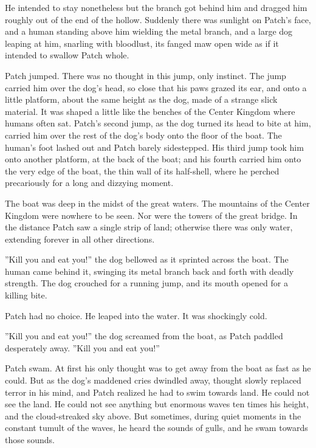 \documentclass[11pt]{article}
\begin{document}
 He intended to stay nonetheless %
 but the branch got behind him and dragged him roughly out of the end of the hollow. Suddenly there was sunlight on Patch's face, and a human standing above him wielding the metal branch, and a large dog leaping at him, snarling with bloodlust, its fanged maw open wide as if it intended to swallow Patch whole.\par
 Patch jumped. There was no thought in this jump, only instinct. The jump carried him over the dog's head, so close that his paws grazed its ear, and onto a little platform, about the same height as the dog, made of a strange slick material. It was shaped a little like the benches of the Center Kingdom where humans often sat. Patch's second jump, as the dog turned its head to bite at him, carried him over the rest of the dog's body onto the floor of the boat. The human's foot lashed out and Patch barely sidestepped. His third jump took him onto another platform, at the back of the boat; and his fourth carried him onto the very edge of the boat, the thin wall of its half-shell, where he perched precariously for a long and dizzying moment.\par
The boat was deep in the midst of the great waters. The mountains of the Center Kingdom were nowhere to be seen. Nor were the towers of the great bridge. In the distance Patch saw a single strip of land; otherwise there was only water, extending forever in all other directions.\par
''Kill you and eat you!'' the dog bellowed as it sprinted across the boat. The human came behind it, swinging its metal branch back and forth with deadly strength. The dog crouched for a running jump, and its mouth opened for a killing bite.\par
Patch had no choice. He leaped into the water. It was shockingly cold.\par
''Kill you and eat you!'' the dog screamed from the boat, as Patch paddled desperately away. ''Kill you and eat you!''\par
 Patch swam. At first his only thought was to get away from the boat as fast as he could. But as the dog's maddened cries dwindled away, thought slowly replaced terror in his mind, and Patch realized he had to swim towards land. He could not see the land. He could not see anything but enormous waves ten times his height, and the cloud-streaked sky above. But sometimes, during quiet moments in the constant tumult of the waves, he heard the sounds of gulls, and he swam towards those sounds.\par
\end{document}
